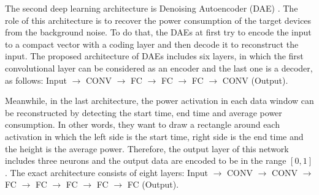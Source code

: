 The second deep learning architecture is Denoising Autoencoder (DAE) \cite{Vincent08}. The role of this architecture is to recover the power consumption of the target devices from the background noise. To do that, the DAEs at first try to encode the input to a compact vector with a coding layer and then decode it to reconstruct the input. The proposed architecture of DAEs includes six layers, in which the first convolutional layer can be considered as an encoder and the last one is a decoder, as follows: Input $\rightarrow$ CONV $\rightarrow$ FC $\rightarrow$ FC $\rightarrow$ FC $\rightarrow$ CONV (Output).


Meanwhile, in the last architecture, the power activation in each data window can be reconstructed by detecting the  start time, end time and average power consumption. In other words, they want to draw a rectangle around each activation in which the left side is the start time, right side is the end time and the height is the average power. Therefore, the output layer of this network includes three neurons and the output data are encoded to be in the range $[0,1]$. The exact architecture consists of eight layers: Input $\rightarrow$ CONV $\rightarrow$ CONV $\rightarrow$ FC $\rightarrow$ FC $\rightarrow$ FC $\rightarrow$ FC $\rightarrow$ FC (Output).
